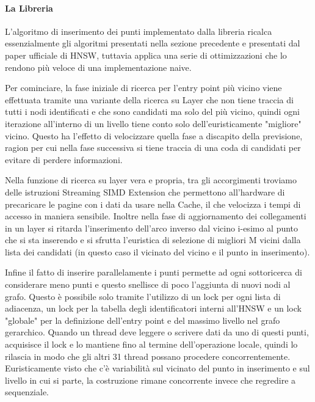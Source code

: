 \paragraph{La Libreria}

L'algoritmo di inserimento dei punti implementato dalla libreria ricalca essenzialmente gli algoritmi presentati nella sezione precedente e presentati dal paper ufficiale di HNSW, tuttavia applica una serie di ottimizzazioni che lo rendono pi\`u veloce di una implementazione naive.

Per cominciare, la fase iniziale di ricerca per l'entry point pi\`u vicino viene effettuata tramite una variante della ricerca su Layer che non tiene traccia di tutti i nodi identificati e che sono candidati ma solo del pi\`u vicino, quindi ogni iterazione all'interno di un livello tiene conto solo dell'euristicamente "migliore" vicino.
Questo ha l'effetto di velocizzare quella fase a discapito della previsione, ragion per cui nella fase successiva si tiene traccia di una coda di candidati per evitare di perdere informazioni.

Nella funzione di ricerca su layer vera e propria, tra gli accorgimenti troviamo delle istruzioni Streaming SIMD Extension che permettono all'hardware di precaricare le pagine con i dati da usare nella Cache, il che velocizza i tempi di accesso in maniera sensibile.
Inoltre nella fase di aggiornamento dei collegamenti in un layer si ritarda l'inserimento dell'arco inverso dal vicino i-esimo al punto che si sta inserendo e si sfrutta l'euristica di selezione di migliori M vicini dalla lista dei candidati (in questo caso il vicinato del vicino e il punto in inserimento).

Infine il fatto di inserire parallelamente i punti permette ad ogni sottoricerca di considerare meno punti e questo snellisce di poco l'aggiunta di nuovi nodi al grafo.
Questo \`e possibile solo tramite l'utilizzo di un lock per ogni lista di adiacenza, un lock per la tabella degli identificatori interni all'HNSW e un lock "globale" per la definizione dell'entry point e del massimo livello nel grafo gerarchico.
Quando un thread deve leggere o scrivere dati da uno di questi punti, acquisisce il lock e lo mantiene fino al termine dell'operazione locale, quindi lo rilascia in modo che gli altri 31 thread possano procedere concorrentemente.
Euristicamente visto che c'\`e variabilit\`a sul vicinato del punto in inserimento e sul livello in cui si parte, la costruzione rimane concorrente invece che regredire a sequenziale.


